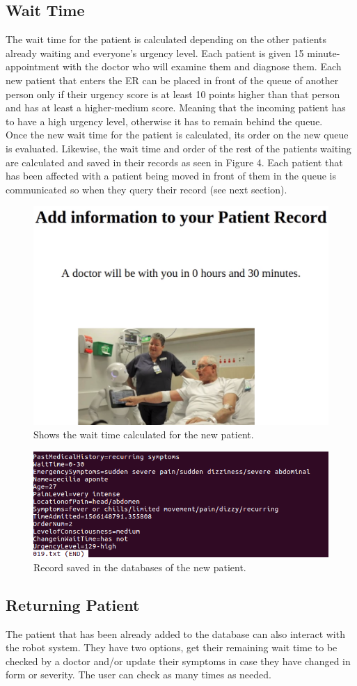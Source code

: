 \documentclass[letterpaper]{article}
\begin{document}
\subsection{Wait Time}
The wait time for the patient is calculated depending on the other patients already waiting and everyone's urgency level. Each patient is given 15 minute-appointment with the doctor who will examine them and diagnose them. Each new patient that enters the ER can be placed in front of the queue of another person only if their urgency score is at least 10 points higher than that person and has at least a higher-medium score. Meaning that the incoming patient has to have a high urgency level, otherwise it has to remain behind the queue.\\

Once the new wait time for the patient is calculated, its order on the new queue is evaluated. Likewise, the wait time and order of the rest of the patients waiting are calculated and saved in their records as seen in Figure 4. Each patient that has been affected with a patient being moved in front of them in the queue is communicated so when they query their record (see next section).

\begin{figure}
  \centering
  \includegraphics[width=.35\textwidth]{RecordWaitTime.png}\hfill
   \caption{Shows the wait time calculated for the new patient.}
\end{figure}

\begin{figure}
  \centering
  \includegraphics[width=.35\textwidth]{RecordNew019-Aponte.png}\hfill
   \caption{Record saved in the databases of the new patient.}
\end{figure}

\subsection{Returning Patient}
The patient that has been already added to the database can also interact with the robot system. They have two options, get their remaining wait time to be checked by a doctor and/or update their symptoms in case they have changed in form or severity. The user can check as many times as needed.\\
\end{document}
